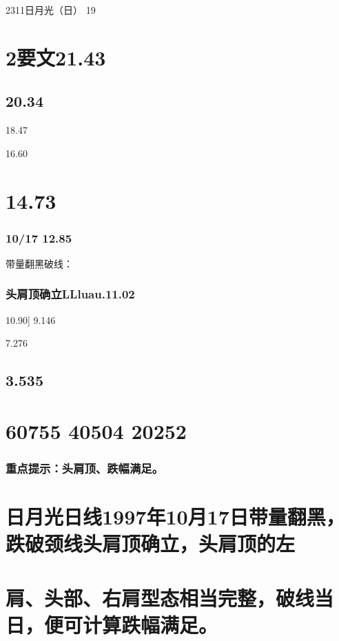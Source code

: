 \documentclass{article}
\begin{document}
2311日月光（日） 19

\section{2要文21.43}

\subsection{20.34}

18.47

16.60

\section{14.73}

\subsubsection{10/17 12.85}

带量翻黑破线：

\subsubsection{头肩顶确立LLluau.11.02}

10.90] 9.146

7.276

\subsection{3.535}

\section{60755 40504 20252}

\subsubsection{重点提示：头肩顶、跌幅满足。}

\section{日月光日线1997年10月17日带量翻黑，跌破颈线头肩顶确立，头肩顶的左}

\section{肩、头部、右肩型态相当完整，破线当日，便可计算跌幅满足。}
\end{document}

